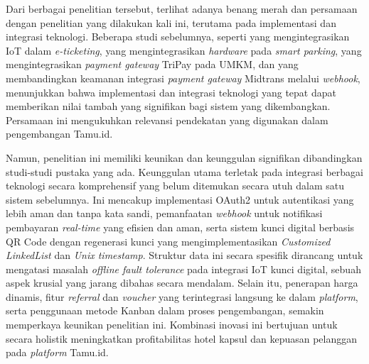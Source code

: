 Dari berbagai penelitian tersebut, terlihat adanya benang merah dan persamaan dengan penelitian yang dilakukan kali ini, terutama pada implementasi dan integrasi teknologi. Beberapa studi sebelumnya, seperti \cite{HanJie_Alduais_2023} yang mengintegrasikan IoT dalam \textit{e-ticketing}, \cite{assidiqie2022implementasi} yang mengintegrasikan \textit{hardware} pada \textit{smart parking}, \cite{Rachman_Rusdianto_Wihandika_2023} yang mengintegrasikan \textit{payment gateway} TriPay pada UMKM, dan \cite{Alma_Prihanto_2024} yang membandingkan keamanan integrasi \textit{payment gateway} Midtrans melalui \textit{webhook}, menunjukkan bahwa implementasi dan integrasi teknologi yang tepat dapat memberikan nilai tambah yang signifikan bagi sistem yang dikembangkan. Persamaan ini mengukuhkan relevansi pendekatan yang digunakan dalam pengembangan Tamu.id.

Namun, penelitian ini memiliki keunikan dan keunggulan signifikan dibandingkan studi-studi pustaka yang ada. Keunggulan utama terletak pada integrasi berbagai teknologi secara komprehensif yang belum ditemukan secara utuh dalam satu sistem sebelumnya. Ini mencakup implementasi OAuth2 untuk autentikasi yang lebih aman dan tanpa kata sandi, pemanfaatan \textit{webhook} untuk notifikasi pembayaran \textit{real-time} yang efisien dan aman, serta sistem kunci digital berbasis QR Code dengan regenerasi kunci yang mengimplementasikan \textit{Customized LinkedList} dan \textit{Unix timestamp}. Struktur data ini secara spesifik dirancang untuk mengatasi masalah \textit{offline fault tolerance} pada integrasi IoT kunci digital, sebuah aspek krusial yang jarang dibahas secara mendalam. Selain itu, penerapan harga dinamis, fitur \textit{referral} dan \textit{voucher} yang terintegrasi langsung ke dalam \textit{platform}, serta penggunaan metode Kanban dalam proses pengembangan, semakin memperkaya keunikan penelitian ini. Kombinasi inovasi ini bertujuan untuk secara holistik meningkatkan profitabilitas hotel kapsul dan kepuasan pelanggan pada \textit{platform} Tamu.id.
